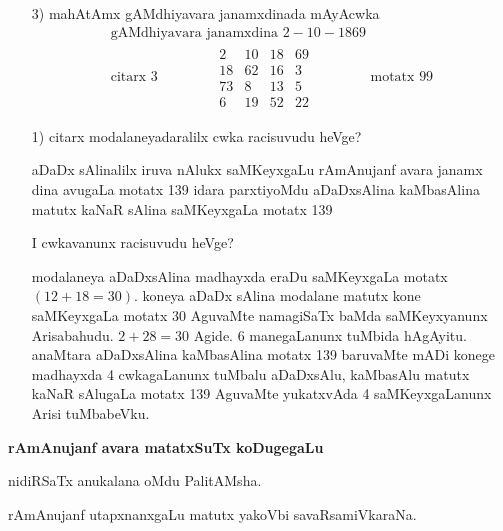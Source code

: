 \begin{enumerate}
{\rm 4} neV vagaRda mAyAcwkada racane
$A, B, C, D$ matutx $P, Q, R, S$ beVre beVre dhana pUNaRMkagaLAgirali Aga keLage koTiTxruva mAyAcwkavu meVlina akaSxragaLige yAvudeV dhana pUNARMka bele koTaTxrU sari hoVguva pUNARMka mAyA cwkavAgirutatxde.
$$
\begin{matrix}
A+P & D+S & C+Q & B+R\\
C+R & B+Q & A+S & D+P\\
B+S & C+P & D+R & A+Q\\
D+Q & A+R & B+P & C+S
\end{matrix}
$$

\item[{\rm 3)}] mahAtAmx gAMdhiyavara janamxdinada mAyAcwka
\begin{gather*}
\text{gAMdhiyavara janamxdina }  2-10-1869\\
\text{citarx } 3 \qquad \qquad 
\begin{matrix}
2 & 10 & 18 & 69\\
18 & 62 & 16 & 3\\
73 & 8 & 13 & 5\\
6 & 19 & 52 & 22
\end{matrix} \qquad \qquad 
\text{motatx } 99
\end{gather*}

\item[{\rm 1)}] citarx modalaneyadaralilx cwka racisuvudu heVge?

 aDaDx sAlinalilx iruva nAlukx saMKeyxgaLu rAmAnujanf avara janamx dina avugaLa motatx {\rm 139} idara parxtiyoMdu aDaDxsAlina kaMbasAlina matutx kaNaR sAlina saMKeyxgaLa motatx {\rm 139} 
 
I cwkavanunx racisuvudu heVge? 

modalaneya aDaDxsAlina madhayxda eraDu saMKeyxgaLa motatx $(12+18=30)$. koneya aDaDx sAlina modalane matutx kone saMKeyxgaLa motatx {\rm 30} AguvaMte namagiSaTx baMda saMKeyxyanunx Arisabahudu. $2+28=30$ Agide. {\rm 6} manegaLanunx tuMbida hAgAyitu. anaMtara aDaDxsAlina kaMbasAlina motatx {\rm 139} baruvaMte mADi konege madhayxda {\rm 4} cwkagaLanunx tuMbalu aDaDxsAlu, kaMbasAlu matutx kaNaR sAlugaLa motatx {\rm 139} AguvaMte yukatxvAda {\rm 4} saMKeyxgaLanunx Arisi tuMbabeVku.
\end{enumerate}

\textbf{rAmAnujanf avara matatxSuTx koDugegaLu}

nidiRSaTx anukalana oMdu PalitAMsha.

rAmAnujanf utapxnanxgaLu matutx yakoVbi savaRsamiVkaraNa.

